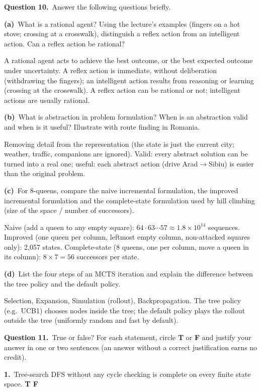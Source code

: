 \documentclass[11pt,a4paper]{article}
\newcommand{\question}[1]{\par\medskip\noindent\textbf{Question #1.}\ }
\newcommand{\subq}[1]{\par\smallskip\noindent\textbf{#1}\ }
\begin{document}
\question{10}Answer the following questions briefly.
\subq{(a)}What is a rational agent? Using the lecture's examples (fingers on a hot stove; crossing at a crosswalk), distinguish a reflex action from an intelligent action. Can a reflex action be rational?
\begin{solbox}
A rational agent acts to achieve the best outcome, or the best expected outcome under uncertainty. A reflex action is immediate, without deliberation (withdrawing the fingers); an intelligent action results from reasoning or learning (crossing at the crosswalk). A reflex action can be rational or not; intelligent actions are usually rational.
\end{solbox}
\subq{(b)}What is abstraction in problem formulation? When is an abstraction valid and when is it useful? Illustrate with route finding in Romania.
\begin{solbox}
Removing detail from the representation (the state is just the current city; weather, traffic, companions are ignored). Valid: every abstract solution can be turned into a real one; useful: each abstract action (drive Arad$\to$Sibiu) is easier than the original problem.
\end{solbox}
\subq{(c)}For 8-queens, compare the naive incremental formulation, the improved incremental formulation and the complete-state formulation used by hill climbing (size of the space / number of successors).
\begin{solbox}
Naive (add a queen to any empty square): $64\cdot63\cdots57\approx1.8\times10^{14}$ sequences. Improved (one queen per column, leftmost empty column, non-attacked squares only): 2{,}057 states. Complete-state (8 queens, one per column, move a queen in its column): $8\times7=56$ successors per state.
\end{solbox}
\subq{(d)}List the four steps of an MCTS iteration and explain the difference between the tree policy and the default policy.
\begin{solbox}
Selection, Expansion, Simulation (rollout), Backpropagation. The tree policy (e.g.\ UCB1) chooses nodes inside the tree; the default policy plays the rollout outside the tree (uniformly random and fast by default).
\end{solbox}
\question{11}True or false?
For each statement, circle \textbf{T} or \textbf{F} and justify your answer in one or two sentences (an answer without a correct justification earns no credit).
\subq{1.}Tree-search DFS without any cycle checking is complete on every finite state space. \hfill \textbf{T \quad F}
\end{document}
